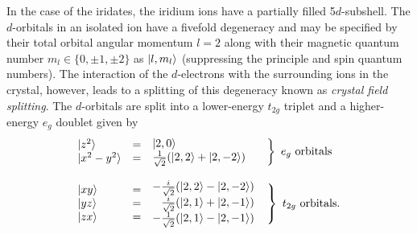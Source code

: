 In the case of the iridates, the iridium ions have a partially filled 5$d$-subshell.
The $d$-orbitals in an isolated ion have a fivefold degeneracy and may be specified by their total orbital angular momentum $l = 2$ along with their magnetic quantum number $m_l \in \{ 0, \pm 1, \pm 2 \}$ as $| l, m_l \rangle$ (suppressing the principle and spin quantum numbers).
The interaction of the $d$-electrons with the surrounding ions in the crystal, however, leads to a splitting of this degeneracy known as \textit{crystal field splitting}.
The $d$-orbitals are split into a lower-energy $t_{2g}$ triplet and a higher-energy $e_g$ doublet given by~\cite{Ballhausen1962,Griffith1971}
%
\begin{align}
	\begin{matrix*}[l]
		\begin{matrix*}[l]
			\ket{z^2}			\\
			\ket{x^2 - y^2}		
		\end{matrix*}
		&
		\begin{matrix*}[l]
			= \\
			=
		\end{matrix*}
		&
		\begin{matrix*}[l]
			\ket{2, 0} \\
			\frac{1}{\sqrt{2}} (\ket{2, 2} + \ket{2, -2})
		\end{matrix*}
		&
		\left.
		\begin{matrix*}[l]
			\\ \\
		\end{matrix*}
		\right\}~e_g~{\rm orbitals} \nonumber\\
		\nonumber\\
		\begin{matrix*}[l]
			\ket{xy}	\\
			\ket{yz}	\\
			\ket{zx}	
		\end{matrix*}
		&
		\begin{matrix*}[l]
			= \\
			= \\
			=
		\end{matrix*}
		&
		\begin{matrix*}[l]
			-\frac{i}{\sqrt{2}} (\ket{2, 2} - \ket{2, -2}) \\
			\phantom{-}\frac{i}{\sqrt{2}} (\ket{2, 1} + \ket{2, -1}) \\
			-\frac{1}{\sqrt{2}} (\ket{2, 1} - \ket{2, -1})
		\end{matrix*}
		&
		\left.
		\begin{matrix*}[l]
			\\ \\ \\
		\end{matrix*}
		\right\}~t_{2g}~{\rm orbitals}.
	\end{matrix*}
\end{align}
%

